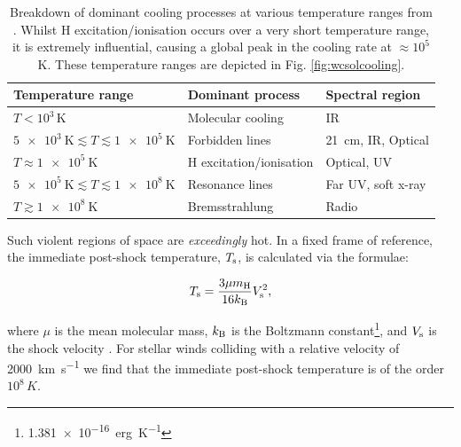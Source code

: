 \begin{table}[h]
  \centering
  \begin{tabular}{lll}
  \hline 
  Temperature range & Dominant process & Spectral region \\
  \hline
  $T < 10^3 \, \si{\kelvin}$ & Molecular cooling & IR \\
  $\SI{5e3}{\kelvin} \lesssim T \lesssim \SI{1e5}{\kelvin} $ & Forbidden lines & \SI{21}{cm}, IR, Optical \\
  $T \approx \SI{1e5}{\kelvin}$ & H excitation/ionisation & Optical, UV \\
  $\SI{5e5}{\kelvin} \lesssim T \lesssim \SI{1e8}{\kelvin} $ & Resonance lines & Far UV, soft x-ray \\
  $T \gtrsim \SI{1e8}{\kelvin} $ & Bremsstrahlung & Radio \\ \hline
  \end{tabular}
  \caption[Cooling processes at various temperature ranges]{Breakdown of dominant cooling processes at various temperature ranges from \textcite[Ch.~6]{dysonPhysicsInterstellarMedium2021}. Whilst H excitation/ionisation occurs over a very short temperature range, it is extremely influential, causing a global peak in the cooling rate at $\approx 10^5$ \si{\kelvin}. These temperature ranges are depicted in Fig. \ref{fig:wcsolcooling}.}
  \label{tab:coolprocess}
\end{table}

Such violent regions of space are \emph{exceedingly} hot.
In a fixed frame of reference, the immediate post-shock temperature, $T_\text{s}$, is calculated via the formulae:

\begin{equation}
  T_\text{s} = \frac{3\mu m_\text{H}}{16 k_\text{B}} V_\text{s}^2 ,
\end{equation}

\noindent
where $\mu$ is the mean molecular mass, $k_\text{B}$ is the Boltzmann constant\footnote{\SI{1.381e-16}{erg.K^{-1}}}, and $V_\text{s}$ is the shock velocity
\parencite[Ch.~9]{macielHydrodynamicsStellarWinds2014}.
For stellar winds colliding with a relative velocity of \SI{2000}{\kilo\metre\per\second} we find that the immediate post-shock temperature is of the order $10^8\,\si{K}$.

